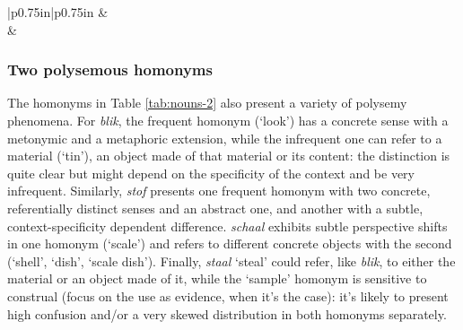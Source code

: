 \documentclass[
]{book}
\begin{document}
\begin{longtable}[c]{|p{0.75in}|p{0.75in}}
 &  \\





 &  \\

\noalign{\global\setlength{\arrayrulewidth}{2pt}}

\end{longtable}

\hypertarget{two-polysemous-homonyms}{%
\subsubsection{Two polysemous homonyms}\label{two-polysemous-homonyms}}

The homonyms in Table \ref{tab:nouns-2} also present a variety of polysemy phenomena. For \emph{blik}, the frequent homonym (`look') has a concrete sense with a metonymic and a metaphoric extension, while the infrequent one can refer to a material (`tin'), an object made of that material or its content: the distinction is quite clear but might depend on the specificity of the context and be very infrequent. Similarly, \emph{stof} presents one frequent homonym with two concrete, referentially distinct senses and an abstract one, and another with a subtle, context-specificity dependent difference. \emph{schaal} exhibits subtle perspective shifts in one homonym (`scale') and refers to different concrete objects with the second (`shell', `dish', `scale dish'). Finally, \emph{staal} `steal' could refer, like \emph{blik}, to either the material or an object made of it, while the `sample' homonym is sensitive to construal (focus on the use as evidence, when it's the case): it's likely to present high confusion and/or a very skewed distribution in both homonyms separately.
\end{document}
